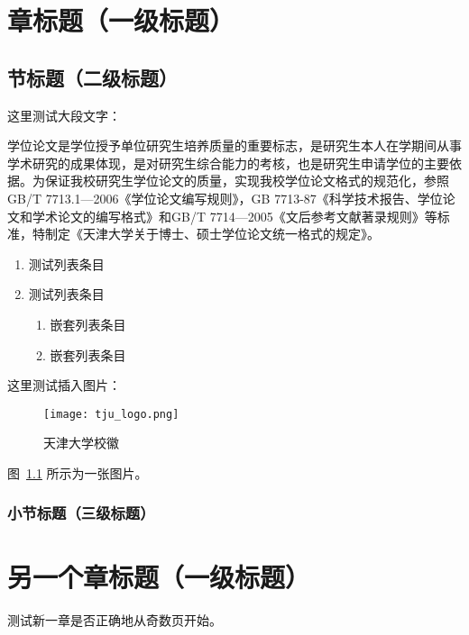 
\chapter{章标题（一级标题）}

\section{节标题（二级标题）}

这里测试大段文字：

学位论文是学位授予单位研究生培养质量的重要标志，是研究生本人在学期间从事学术研究的成果体现，是对研究生综合能力的考核，也是研究生申请学位的主要依据。为保证我校研究生学位论文的质量，实现我校学位论文格式的规范化，参照GB/T 7713.1—2006《学位论文编写规则》，GB 7713-87《科学技术报告、学位论文和学术论文的编写格式》和GB/T 7714—2005《文后参考文献著录规则》等标准，特制定《天津大学关于博士、硕士学位论文统一格式的规定》。

\begin{enumerate}[label={（\arabic*）}]
    \item 测试列表条目
    \item 测试列表条目 
    \begin{enumerate}[label={（\roman*）}]
        \item 嵌套列表条目
        \item 嵌套列表条目
    \end{enumerate}
\end{enumerate}

这里测试插入图片：
\begin{figure}[!h]
    \centering\small
    \texttt{[image: tju\_logo.png]}
    \caption{天津大学校徽}
    \label{fig:logo}
\end{figure}
图~\ref{fig:logo} 所示为一张图片。

\subsection{小节标题（三级标题）}

\chapter{另一个章标题（一级标题）}

测试新一章是否正确地从奇数页开始。